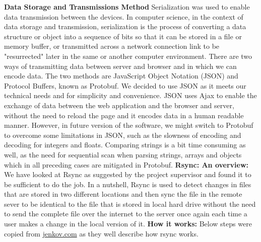 \documentclass{article}
\begin{document}
\hfill \break
\textbf{Data Storage and Transmissions Method}
Serialization was used to enable data transmission between the devices. In computer science, in the context of data storage and transmission, serialization is the process of converting a data structure or object into a sequence of bits so that it can be stored in a file or memory buffer, or transmitted across a network connection link to be "resurrected" later in the same or another computer environment. There are two ways of transmitting data between server and browser and in which we can encode data. The two methods are JavaScript Object Notation (JSON) and Protocol Buffers, known as Protobuf. We decided to use JSON as it meets our technical needs and for simplicity and convenience. JSON uses Ajax to enable the exchange of data between the web application and the browser and server, without the need to reload the page and it encodes data in a human readable manner. However, in future version of the software, we might switch to Protobuf to overcome some limitations in JSON, such as the slowness of encoding and decoding for integers and floats. Comparing strings is a bit time consuming as well, as the need for sequential scan when parsing strings, arrays and objects which in all preceding cases are mitigated in Protobuf.
\newline
\hfill \break
\textbf{Rsync: An overview:} We have looked at Rsync as suggested by the project supervisor and found it to be sufficient to do the job. In a nutshell, Rsync is used to detect changes in files that are stored in two different locations and then sync the file in the remote sever to be identical to the file that is stored in local hard drive without the need to send the complete file over the internet to the server once again each time a user makes a change in the local version of it.
\newline
\hfill \break
\textbf{How it works:}
Below steps were copied from \underline{jenkov.com} as they well describe how rsync works.
\end{document}
